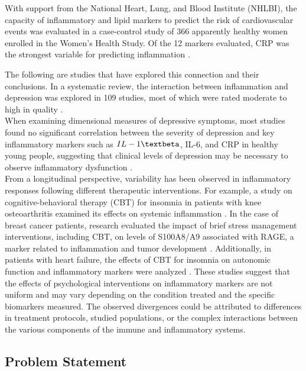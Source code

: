 \documentclass[jou]{apa7}
\begin{document}
With support from the National Heart, Lung, and Blood Institute (NHLBI), the capacity of inflammatory and lipid markers to predict the risk of cardiovascular events was evaluated in a case-control study of 366 apparently healthy women enrolled in the Women’s Health Study. Of the 12 markers evaluated, CRP was the strongest variable for predicting inflammation \parencite{ridkerHighsensitivityCreactiveProtein2004}.

The following are studies that have explored this connection and their conclusions. In a systematic review, the interaction between inflammation and depression was explored in 109 studies, most of which were rated moderate to high in quality \parencite{Toenders2022}.\\

When examining dimensional measures of depressive symptoms, most studies found no significant correlation between the severity of depression and key inflammatory markers such as $IL-1\textbeta$, IL-6, and CRP in healthy young people, suggesting that clinical levels of depression may be necessary to observe inflammatory dysfunction \parencite{Toenders2022}.\\

From a longitudinal perspective, variability has been observed in inflammatory responses following different therapeutic interventions. For example, a study on cognitive-behavioral therapy (CBT) for insomnia in patients with knee osteoarthritis examined its effects on systemic inflammation \parencite{munPreliminaryExaminationEffects2024}. In the case of breast cancer patients, research evaluated the impact of brief stress management interventions, including CBT, on levels of S100A8/A9 associated with RAGE, a marker related to inflammation and tumor development \parencite{taubEffectsRandomizedTrial2019}. Additionally, in patients with heart failure, the effects of CBT for insomnia on autonomic function and inflammatory markers were analyzed \parencite{redekerEffectsCognitiveBehavioral2020}. These studies suggest that the effects of psychological interventions on inflammatory markers are not uniform and may vary depending on the condition treated and the specific biomarkers measured. The observed divergences could be attributed to differences in treatment protocols, studied populations, or the complex interactions between the various components of the immune and inflammatory systems.

\subsection{Problem Statement}
\end{document}
